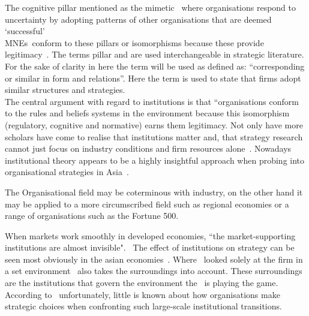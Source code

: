  The cognitive pillar mentioned as the mimetic \iso~where organisations respond to uncertainty by adopting patterns of other organisations that are deemed `successful'~\cite{Westney:2005,Peng:2008,Kostova:1999,DiMaggio:1983,Scott:1995}\\ 
\glspl{MNE}~conform to these pillars or isomorphisms because these provide legitimacy~\cite{Powell:1991}.
The terms pillar and \iso are used interchangeable in strategic literature. 
For the sake of clarity in here the term \iso will be used as defined as: ``corresponding or similar in form and relations''. Here the term is used to state that firms adopt similar structures and strategies.\\

The central argument with regard to institutions is that “organisations conform to the rules and beliefs systems in the environment because this isomorphism (regulatory, cognitive and normative) earns them legitimacy.
Not only have more scholars have come to realise that institutions matter and, that strategy research cannot just focus on industry conditions and firm resources alone~\cite{Powell:1991,Scott:1995}.
Nowadays institutional theory appears to be a highly insightful approach when probing into organisational strategies in Asia~\cite{Hoskisson:2000}.


\cite{Westney:2005} The Organisational field may be coterminous with industry, on the other hand it may be applied to a more circumscribed field such as regional economies or a range of organisations such as the Fortune 500.


 


When markets work smoothly in developed economies, ``the market-supporting institutions are almost invisible".~\cite{McMillan:2008}
The effect of institutions on strategy can be seen most obviously in the asian economies~\cite{Peng:2002}.
Where \rbv~looked solely at the firm in a set environment \ibv~also takes the surroundings into account. These surroundings are the institutions that govern the environment the \mne~is playing the game. \\

According to~\cite{Peng:2003} unfortunately, little is known about how organisations make strategic choices when confronting such large-scale institutional transitions.